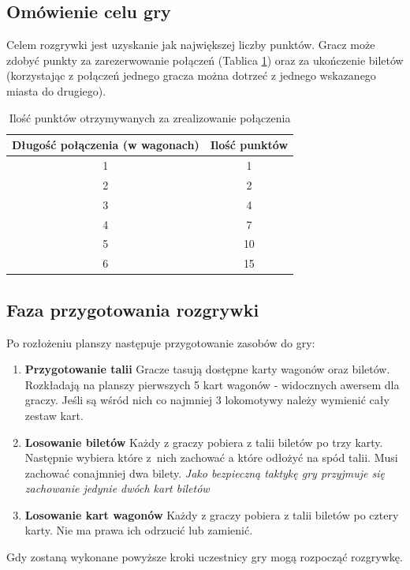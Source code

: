 \documentclass[12pt, oneside]{report}
\begin{document}
\subsection{Omówienie celu gry}
Celem rozgrywki jest uzyskanie jak największej liczby punktów. Gracz może zdobyć punkty za zarezerwowanie połączeń (Tablica  \ref{table:points}) oraz za ukończenie biletów (korzystając z połączeń jednego gracza można dotrzeć z jednego wskazanego miasta do drugiego). 

\begin{table}[h]
	\begin{center}
		\begin{tabular}{|c|c|} \hline
		\textbf{Długość połączenia} (w wagonach) & \textbf{Ilość punktów} \\ \hline
		1 & 1 \\ \hline
		2 & 2 \\ \hline
		3 & 4 \\ \hline
		4 & 7 \\ \hline
		5 & 10 \\ \hline
		6 & 15 \\ \hline
		\end{tabular}	
		\caption{Ilość punktów otrzymywanych za zrealizowanie połączenia}
		\label{table:points}
	\end{center}

\end{table}

\subsection{Faza przygotowania rozgrywki}
Po rozłożeniu planszy następuje przygotowanie zasobów do gry:
\begin{enumerate}
	\item \textbf{Przygotowanie talii}
	\subitem Gracze tasują dostępne karty wagonów oraz biletów. Rozkładają na planszy pierwszych 5 kart wagonów - widocznych awersem dla graczy. Jeśli są wśród nich co najmniej 3 lokomotywy należy wymienić cały zestaw kart.
	\item \textbf{Losowanie biletów}
	\subitem Każdy z graczy pobiera z talii biletów po trzy karty. Następnie wybiera które z~nich zachować a które odłożyć na spód talii. Musi zachować conajmniej dwa bilety. \textit{Jako bezpieczną taktykę gry przyjmuje się zachowanie jedynie dwóch kart biletów}
	\item \textbf{Losowanie kart wagonów}
	\subitem Każdy z graczy pobiera z talii biletów po cztery karty. Nie ma prawa ich odrzucić lub zamienić.
\end{enumerate}
Gdy zostaną wykonane powyższe kroki uczestnicy gry mogą rozpocząć rozgrywkę. 
\end{document}
